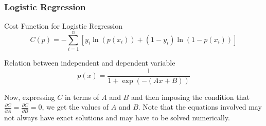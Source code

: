 \documentclass{beamer}
\begin{document}
    \begin{frame}
        \frametitle{Logistic Regression}

        \begin{block}{Cost Function for Logistic Regression}
            \begin{equation}
                C(p) = -\sum_{i = 1}^{n} [y_{i}\ln(p(x_{i})) + (1-y_{i})\ln(1 - p(x_{i}))]
            \end{equation}
        \end{block}

        \begin{block}{Relation between independent and dependent variable}
            \begin{equation}
                p(x) = \frac{1}{1 + \exp(-(Ax + B))}
            \end{equation}
        \end{block}
        Now, expressing $C$ in terms of $A$ and $B$ and then imposing the condition that $\frac{\partial C}{\partial A} = \frac{\partial C}{\partial B} = 0$, 
        we get the values of $A$ and $B$. Note that the equations involved may not always have exact solutions and may have to be solved numerically.    
    \end{frame}
\end{document}
